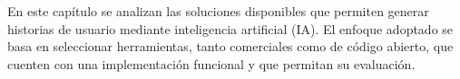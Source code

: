 En este capítulo se analizan las soluciones disponibles que permiten generar historias de usuario mediante inteligencia artificial (IA). El enfoque adoptado se basa en seleccionar herramientas, tanto comerciales como de código abierto, que cuenten con una implementación funcional y que permitan su evaluación. %



% 


% 

% 

% 


